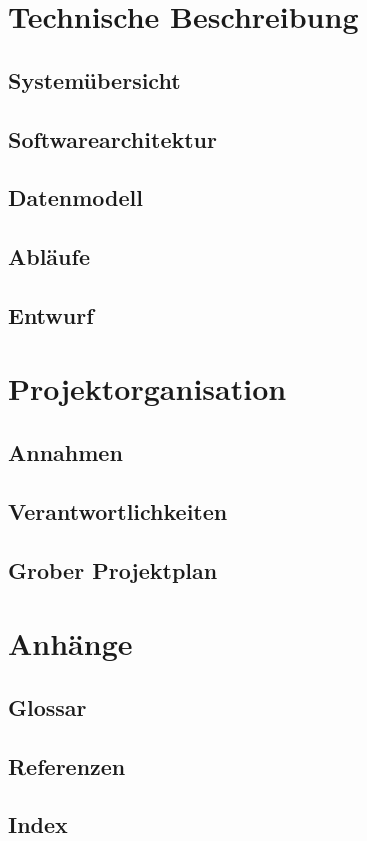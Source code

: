 	
\section{Technische Beschreibung}
	
	\subsection{Systemübersicht}
	
	\subsection{Softwarearchitektur}
	
	\subsection{Datenmodell}
	
	\subsection{Abläufe}
	
	\subsection{Entwurf}
	

\section{Projektorganisation}

	\subsection{Annahmen}
	
	\subsection{Verantwortlichkeiten}
	
	\subsection{Grober Projektplan}
	

\section{Anhänge}

	\subsection{Glossar}
	
	\subsection{Referenzen}
	
	\subsection{Index}
